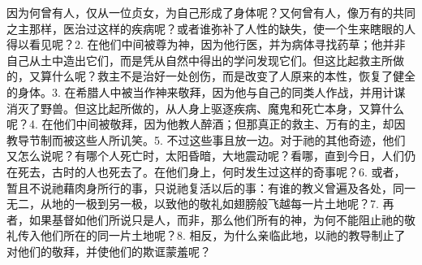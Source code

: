 因为何曾有人，仅从一位贞女，为自己形成了身体呢？又何曾有人，像万有的共同之主那样，医治过这样的疾病呢？或者谁弥补了人性的缺失，使一个生来瞎眼的人得以看见呢？\newline{}2. 在他们中间被尊为神，因为他行医，并为病体寻找药草；他并非自己从土中造出它们，而是凭从自然中得出的学问发现它们。但这比起救主所做的，又算什么呢？救主不是治好一处创伤，而是改变了人原来的本性，恢复了健全的身体。\newline{}3. 在希腊人中被当作神来敬拜，因为他与自己的同类人作战，并用计谋消灭了野兽。但这比起所做的，从人身上驱逐疾病、魔鬼和死亡本身，又算什么呢？\newline{}4. 在他们中间被敬拜，因为他教人醉酒；但那真正的救主、万有的主，却因教导节制而被这些人所讥笑。\newline{}5. 不过这些事且放一边。对于祂的其他奇迹，他们又怎么说呢？有哪个人死亡时，太阳昏暗，大地震动呢？看哪，直到今日，人们仍在死去，古时的人也死去了。在他们身上，何时发生过这样的奇事呢？\newline{}6. 或者，暂且不说祂藉肉身所行的事，只说祂复活以后的事：有谁的教义曾遍及各处，同一无二，从地的一极到另一极，以致他的敬礼如翅膀般飞越每一片土地呢？\newline{}7. 再者，如果基督如他们所说只是人，而非，那么他们所有的神，为何不能阻止祂的敬礼传入他们所在的同一片土地呢？\newline{}8. 相反，为什么亲临此地，以祂的教导制止了对他们的敬拜，并使他们的欺诓蒙羞呢？\par


\section{}

